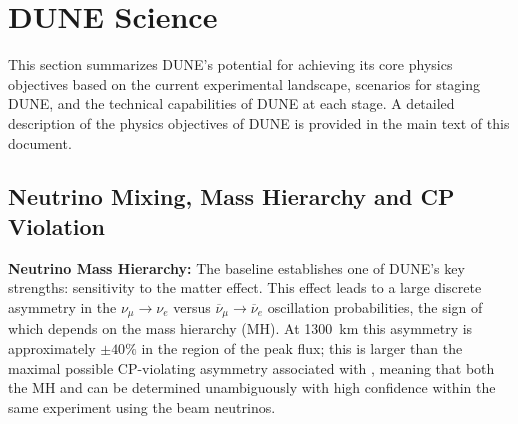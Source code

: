 
\chapter{DUNE Science}
\label{v1ch:science}


This section summarizes DUNE's potential for achieving its core
physics objectives based on the current %
experimental landscape, scenarios for staging DUNE, and 
the technical capabilities of DUNE at each stage.
A detailed description of the physics objectives of DUNE is provided in
the main text of this document. 


\section{Neutrino Mixing, Mass Hierarchy and CP Violation}


\textbf{Neutrino Mass Hierarchy:} The  baseline
establishes one of DUNE's key strengths: sensitivity to the matter
effect. This effect leads to a large discrete asymmetry in the
$\nu_\mu\to \nu_e$ versus $\overline{\nu}_\mu \to \overline{\nu}_e$
oscillation probabilities, the sign of which depends on the mass
hierarchy (MH).  At 1300~km this asymmetry is approximately
$\pm 40\%$ in the region of the peak flux; this is larger than the
maximal possible CP-violating asymmetry associated with \deltacp,
meaning that both the MH and \deltacp can be
determined unambiguously with high confidence within the same
experiment using the beam neutrinos.

